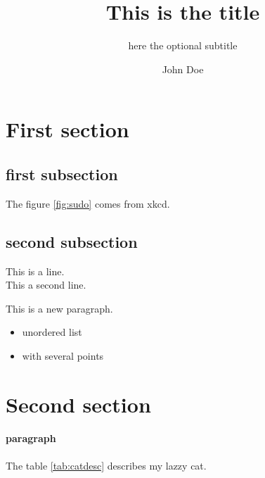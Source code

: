 \documentclass[a4paper,11pt]{article}
\title{This is the title}
\subtitle{here the optional subtitle}
\author{John Doe}
\begin{document}
%
{
}

\newpage

\newpage
\thispagestyle{empty}
\tableofcontents
\listoffigures
\listoftables
\newpage

\section{First section}
\subsection{first subsection}

The figure \ref{fig:sudo} comes from xkcd.

\subsection{second subsection}
This is a line.\\
This a second line.

\bigskip
This is a new paragraph.
\begin{itemize}
    \item unordered list
    \item with several points
\end{itemize}

\section{Second section}

\paragraph*{paragraph}


The table \ref{tab:catdesc} describes my lazzy cat.


%
%
\end{document}
